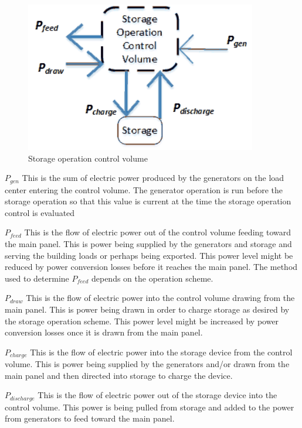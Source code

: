 \begin{figure}[hbtp] %
\centering
\includegraphics[width=0.9\textwidth, height=0.9\textheight, keepaspectratio=true]{media/StorageOperationControlVolume.png}
\caption{Storage operation control volume \protect \label{fig:storage-operation-control-volume}}
\end{figure}

  $ {P_{gen}}  $  This is the sum of electric power produced by the generators on the load center entering the control volume.  The generator operation is run before the storage operation so that this value is current at the time the storage operation control is evaluated 

  $ {P_{feed}}  $  This is the flow of electric power out of the control volume feeding toward the main panel.  This is power being supplied by the generators and storage and serving the building loads or perhaps being exported.  This power level might be reduced by power conversion losses before it reaches the main panel.  The method used to determine $ {P_{feed}}  $ depends on the operation scheme.
  
  $ {P_{draw}}  $  This is the flow of electric power into the control volume drawing from the main panel.  This is power being drawn in order to charge storage as desired by the storage operation scheme.  This power level might be increased by power conversion losses once it is drawn from the main panel.  

  $ {P_{charge}}  $  This is the flow of electric power into the storage device from the control volume.  This is power being supplied by the generators and/or drawn from the main panel and then directed into storage to charge the device.

  $ {P_{discharge}}  $  This is the flow of electric power out of the storage device into the control volume.  This power is being pulled from storage and added to the power from generators to feed toward the main panel. 

